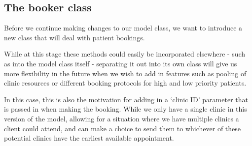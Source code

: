 \documentclass[
  letterpaper,
  DIV=11,
  numbers=noendperiod]{scrreprt}
\begin{document}
\subsection{The booker class}\label{the-booker-class}

Before we continue making changes to our model class, we want to
introduce a new class that will deal with patient bookings.

\begin{tcolorbox}[enhanced jigsaw, colframe=quarto-callout-tip-color-frame, bottomtitle=1mm, breakable, rightrule=.15mm, coltitle=black, colbacktitle=quarto-callout-tip-color!10!white, opacityback=0, leftrule=.75mm, arc=.35mm, toptitle=1mm, title=\textcolor{quarto-callout-tip-color}{\faLightbulb}\hspace{0.5em}{Tip}, titlerule=0mm, colback=white, toprule=.15mm, bottomrule=.15mm, left=2mm, opacitybacktitle=0.6]

While at this stage these methods could easily be incorporated elsewhere
- such as into the model class itself - separating it out into its own
class will give us more flexibility in the future when we wish to add in
features such as pooling of clinic resources or different booking
protocols for high and low priority patients.

In this case, this is also the motivation for adding in a `clinic ID'
parameter that is passed in when making the booking. While we only have
a single clinic in this version of the model, allowing for a situation
where we have multiple clinics a client could attend, and can make a
choice to send them to whichever of these potential clinics have the
earliest available appointment.

\end{tcolorbox}
\end{document}
